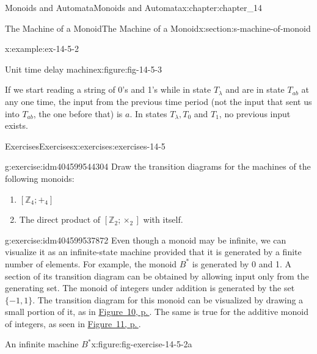 \documentclass[twoside,10pt,]{book}
\numberwithin{equation}{section}
\begin{document}
\begin{chapterptx}{Monoids and Automata}{}{Monoids and Automata}{}{}{x:chapter:chapter_14}
\begin{sectionptx}{The Machine of a Monoid}{}{The Machine of a Monoid}{}{}{x:section:s-machine-of-monoid}
\begin{example}{}{x:example:ex-14-5-2}
\begin{figureptx}{Unit time delay machine}{x:figure:fig-14-5-3}{}
\begin{image}{0.15}{0.7}{0.15}
\end{image}%
\tcblower
\end{figureptx}%
If we start reading a string of 0's and 1's while in state \(T_{\lambda }\) and are in state \(T_{ab}\) at any one time, the input from the previous time period (not the input that sent us into \(T_{ab}\), the one before that) is \(a\). In states \(T_{\lambda }, T_0\) and \(T_1\), no previous input exists.%
\end{example}
%
%
\typeout{************************************************}
\typeout{************************************************}
%
\begin{exercises-subsection}{Exercises}{}{Exercises}{}{}{x:exercises:exercises-14-5}
\begin{divisionexercise}{1}{}{}{g:exercise:idm404599544304}%
Draw the transition diagrams for the machines of the following monoids:%
\begin{enumerate}[label=(\alph*)]
\item{}\(\left[\mathbb{Z}_4;+_4\right]\)%
\item{}The direct product of  \(\left[\mathbb{Z}_2;\times _2\right]\) with itself.%
\end{enumerate}
%
\end{divisionexercise}%
\begin{divisionexercise}{2}{}{}{g:exercise:idm404599537872}%
Even though a monoid may be infinite, we can visualize it as an infinite-state machine provided that it is generated by a finite number of elements. For example, the monoid \(B^*\) is generated by 0 and 1. A section of its transition diagram can be obtained by allowing input only from the generating set. The monoid of integers under addition is generated by the set \(\{-1, 1\}\). The transition diagram for this monoid can be visualized by drawing a small portion of it, as in \hyperref[x:figure:fig-exercise-14-5-2a]{Figure~10, p.\,\pageref{x:figure:fig-exercise-14-5-2a}}. The same is true for the additive monoid of integers, as seen in \hyperref[x:figure:fig-exercise-14-5-2b]{Figure~11, p.\,\pageref{x:figure:fig-exercise-14-5-2b}}.%
\begin{figureptx}{An infinite machine \(B^*\)}{x:figure:fig-exercise-14-5-2a}{}%
\begin{image}{0.15}{0.7}{0.15}%

\end{image}
\end{figureptx}
\end{divisionexercise}
\end{exercises-subsection}
\end{sectionptx}
\end{chapterptx}
\end{document}
